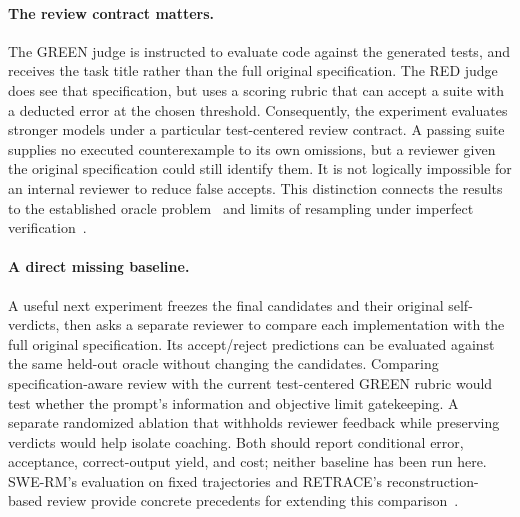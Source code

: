 \paragraph{The review contract matters.} The GREEN judge is instructed to evaluate code against
the generated tests, and receives the task title rather than the full original specification.
The RED judge does see that specification, but uses a scoring rubric that can accept a suite
with a deducted error at the chosen threshold. Consequently, the experiment evaluates stronger
models under a particular test-centered review contract. A passing suite supplies no executed
counterexample to its own omissions, but a reviewer given the original specification could still
identify them. It is not logically impossible for an internal reviewer to reduce false accepts.
This distinction connects the results to the established oracle problem~\cite{barr2015oracle}
and limits of resampling under imperfect verification~\cite{stroebl2026resampling}.

\paragraph{A direct missing baseline.} A useful next experiment freezes the final candidates
and their original self-verdicts, then asks a separate reviewer to compare each implementation
with the full original specification. Its accept/reject predictions can be evaluated against
the same held-out oracle without changing the candidates. Comparing specification-aware review
with the current test-centered GREEN rubric would test whether the prompt's information and
objective limit gatekeeping. A separate randomized ablation that withholds reviewer feedback
while preserving verdicts would help isolate coaching. Both should report conditional error,
acceptance, correct-output yield, and cost; neither baseline has been run here.
SWE-RM's evaluation on fixed trajectories and RETRACE's reconstruction-based review
provide concrete precedents for extending this comparison~\cite{shum2025swerm,li2026retrace}.

